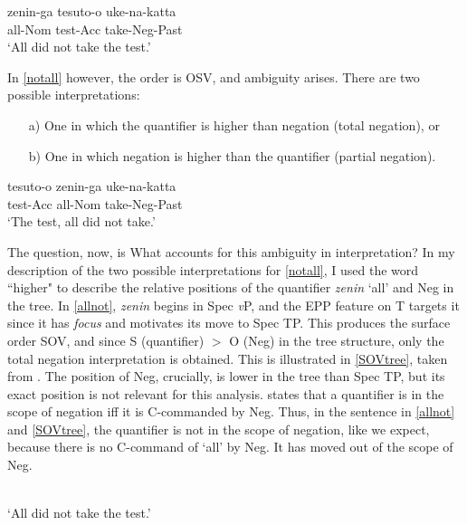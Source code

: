 \documentclass{article}
\begin{document}
\begin{exe}
    \ex \gll zenin-ga tesuto-o uke-na-katta\\ 
        all-Nom test-Acc take-Neg-Past\\ 
    \glt    `All did not take the test.'
    \label{allnot}
\end{exe}
In \ref{notall} however, the order is OSV, and ambiguity arises. There are two possible interpretations:
\begin{itemize}
    \item [a)] One in which the quantifier is higher than negation (total negation), or
    \item [b)] One in which negation is higher than the quantifier (partial negation).
\end{itemize}


\begin{exe}
\ex \gll  tesuto-o zenin-ga uke-na-katta\\ 
        test-Acc all-Nom take-Neg-Past\\ 
    \glt    `The test, all did not take.'
    \label{notall}
\end{exe}

The question, now, is What accounts for this ambiguity in interpretation? In my description of the two possible interpretations for \ref{notall}, I used the word ``higher" to describe the relative positions of the quantifier \textit{zenin} `all' and Neg in the tree. In \ref{allnot}, \textit{zenin} begins in Spec \textit{v}P, and the EPP feature on T targets it since it has \textit{focus} and motivates its move to Spec TP. This produces the surface order SOV, and since S (quantifier) $>$ O (Neg) in the tree structure, only the total negation interpretation is obtained. This is illustrated in \ref{SOVtree}, taken from \cite{Miyagawa2001}. The position of Neg, crucially, is lower in the tree than Spec TP, but its exact position is not relevant for this analysis. \cite{Klima1964} states that a quantifier is in the scope of negation iff it is C-commanded by Neg. Thus, in the sentence in \ref{allnot} and \ref{SOVtree}, the quantifier is not in the scope of negation, like we expect, because there is no C-command of `all' by Neg. It has moved out of the scope of Neg.

\begin{exe}
    \ex
    \label{SOVtree}
\\
`All did not take the test.'
\end{exe}
\end{document}
